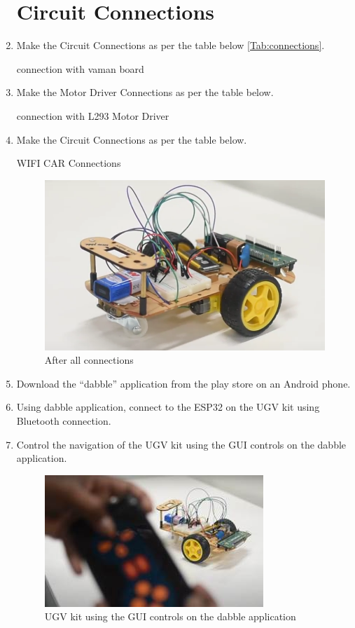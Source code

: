 \begin{enumerate}[label=\thesection.\arabic*.,ref=\thesection.\theenumi]
\section{Circuit Connections}
\item  Make the Circuit Connections as per the table
below \ref{Tab:connections}.
\begin{table}[h]
\centering
	
	\caption{connection with vaman board }
	\label{Tab:connections}
\end{table}
\item Make the Motor Driver Connections as per the
table below.
\begin{table}[h]
\centering
	
	\caption{connection with L293 Motor Driver }
	\label{Tab:connections2}
\end{table}
\item Make the Circuit Connections as per the table
below.
\begin{table}[h]
\centering
	
	\caption{WIFI CAR Connections}
	\label{Tab:connections3}
\end{table}


\begin{figure}[H]
\centering
\includegraphics[width=0.5\columnwidth]{figs/8.png}
\caption{After all connections}
\end{figure}
\item Download the “dabble” application from the play store on an Android phone.
\item Using dabble application, connect to the ESP32 on the UGV kit using Bluetooth connection.
\item Control the navigation of the UGV kit using the GUI controls on the dabble application. 
 \begin{figure}[H]
\centering
\includegraphics[width=0.5\columnwidth]{figs/9.jpg}
\caption{ UGV kit using the GUI controls on the dabble application}
\end{figure}









\end{enumerate}
